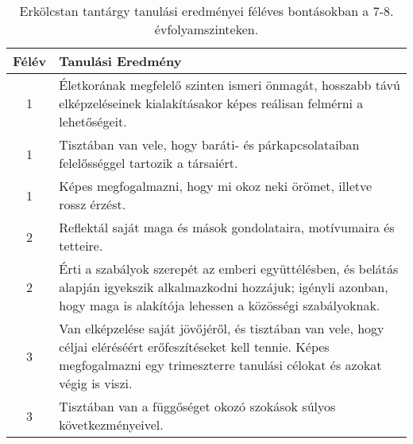        
           \begin{longtable}{c | p{} }
            \caption[Erkölcstan 7-8.]{Erkölcstan tantárgy tanulási eredményei féléves bontásokban a 7-8. évfolyamszinteken. }  \\

            \textbf{Félév} & \textbf{Tanulási Eredmény} \\
            \hline
            \endhead
                                
                                          1 &  Életkorának megfelelő szinten ismeri önmagát, hosszabb távú elképzeléseinek kialakításakor képes reálisan felmérni a lehetőségeit. \\ \hline
                                          1 &  Tisztában van vele, hogy baráti- és párkapcsolataiban felelősséggel tartozik a társaiért. \\ \hline
                                          1 &  Képes megfogalmazni, hogy mi okoz neki örömet, illetve rossz érzést. \\ \hline
                                      
                                
                                          2 &  Reflektál saját maga és mások gondolataira, motívumaira és tetteire. \\ \hline
                                          2 &  Érti a szabályok szerepét az emberi együttélésben, és belátás alapján igyekszik alkalmazkodni hozzájuk; igényli azonban, hogy maga is alakítója lehessen a közösségi szabályoknak. \\ \hline
                                      
                                
                                          3 &  Van elképzelése saját jövőjéről, és tisztában van vele, hogy céljai eléréséért erőfeszítéseket kell tennie. Képes megfogalmazni egy trimeszterre tanulási célokat és azokat végig is viszi. \\ \hline
                                          3 &  Tisztában van a függőséget okozó szokások súlyos következményeivel. \\ \hline
                                      

\end{longtable}
